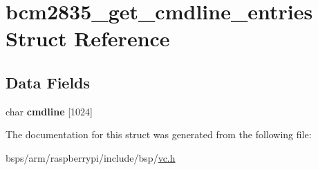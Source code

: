 \hypertarget{structbcm2835__get__cmdline__entries}{}\section{bcm2835\+\_\+get\+\_\+cmdline\+\_\+entries Struct Reference}
\label{structbcm2835__get__cmdline__entries}
\subsection*{Data Fields}
\begin{DoxyCompactItemize}
\item 
\mbox{\label{structbcm2835__get__cmdline__entries_a07fe3212d0d4423fb0180d31393abed3}} 
char {\bfseries cmdline} \mbox{[}1024\mbox{]}
\end{DoxyCompactItemize}


The documentation for this struct was generated from the following file\+:\begin{DoxyCompactItemize}
\item 
bsps/arm/raspberrypi/include/bsp/\mbox{\hyperlink{vc_8h}{vc.\+h}}\end{DoxyCompactItemize}
